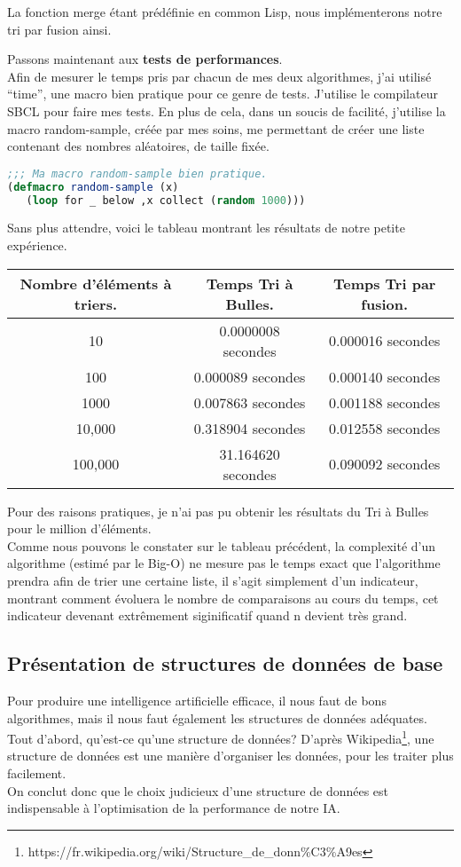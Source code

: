 \documentclass[a4paper, 12pt]{article}
\numberwithin{equation}{subsection}
\begin{document}
La fonction merge étant prédéfinie en common Lisp, nous implémenterons notre tri par fusion ainsi.

Passons maintenant aux {\bf tests de performances}. \\
Afin de mesurer le temps pris par chacun de mes deux algorithmes, j'ai utilisé ``time'', une macro bien pratique pour ce genre de tests. J'utilise le compilateur SBCL pour faire mes tests. En plus de cela, dans un soucis de facilité, j'utilise la macro random-sample, créée par mes soins, me permettant de créer une liste contenant des nombres aléatoires, de taille fixée. \\
\begin{lstlisting}[language=Lisp]
;;; Ma macro random-sample bien pratique.
(defmacro random-sample (x)
   (loop for _ below ,x collect (random 1000)))
\end{lstlisting}
Sans plus attendre, voici le tableau montrant les résultats de notre petite expérience.
\begin{table}[H]
  \begin{tabular}{|c|c|c|}
    \hline {\bf Nombre d'éléments à triers.} & {\bf Temps Tri à Bulles.} & {\bf Temps Tri par fusion.} \\
    \hline 10 & 0.0000008 secondes & 0.000016 secondes \\
    100 & 0.000089 secondes & 0.000140 secondes \\
    1000 & 0.007863 secondes & 0.001188 secondes \\
    10,000 & 0.318904 secondes & 0.012558 secondes \\
    100,000 & 31.164620 secondes & 0.090092 secondes \\
    \hline
  \end{tabular}
\end{table} \smallskip
Pour des raisons pratiques, je n'ai pas pu obtenir les résultats du Tri à Bulles pour le million d'éléments. \\
Comme nous pouvons le constater sur le tableau précédent, la complexité d'un algorithme (estimé par le Big-O) ne mesure pas le temps exact que l'algorithme prendra afin de trier une certaine liste, il s'agit simplement d'un indicateur, montrant comment évoluera le nombre de comparaisons au cours du temps, cet indicateur devenant extrêmement siginificatif quand n devient très grand. \\[0.5cm]
\subsection{Présentation de structures de données de base}
Pour produire une intelligence artificielle efficace, il nous faut de bons algorithmes, mais il nous faut également les structures de données adéquates. \\
Tout d'abord, qu'est-ce qu'une structure de données?
D'après Wikipedia\footnote{https://fr.wikipedia.org/wiki/Structure\_de\_donn\%C3\%A9es}, une structure de données est une manière d'organiser les données, pour les traiter plus facilement. \\
On conclut donc que le choix judicieux d'une structure de données est indispensable à l'optimisation de la performance de notre IA.
\end{document}
